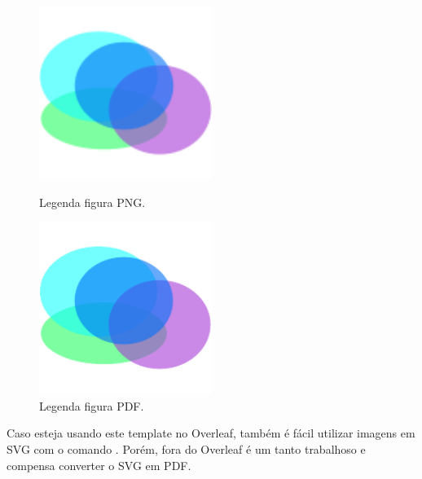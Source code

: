     \begin{figure}[htb]
        \centering
        \begin{minipage}{0.49\textwidth}
            \centering
            \includegraphics[width=0.5\textwidth]{images/figure.png}
            \caption{Legenda figura PNG.}
            \label{fig:e5}
        \end{minipage}
        \hfill
        \begin{minipage}{0.49\textwidth}
            \centering
            \includegraphics[width=0.5\textwidth]{images/figure.pdf}
            \caption{Legenda figura PDF.}
            \label{fig:e6}
        \end{minipage}
    \end{figure}

    Caso esteja usando este template no Overleaf, também é fácil utilizar imagens em SVG com o comando \lstinline[language=TeX, style=Code]||.
    Porém, fora do Overleaf é um tanto trabalhoso e compensa converter o SVG em PDF.

